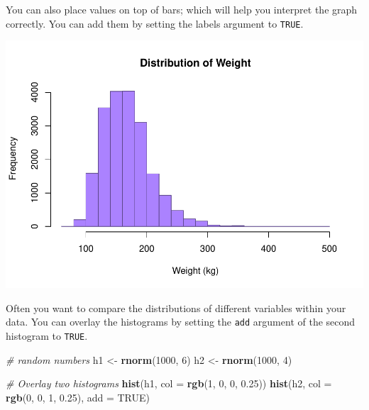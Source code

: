 \documentclass[
]{book}
\newenvironment{Shaded}{\begin{snugshade}}{\end{snugshade}}
\newcommand{\CommentTok}[1]{\textcolor[rgb]{0.56,0.35,0.01}{\textit{#1}}}
\newcommand{\DataTypeTok}[1]{\textcolor[rgb]{0.13,0.29,0.53}{#1}}
\newcommand{\DecValTok}[1]{\textcolor[rgb]{0.00,0.00,0.81}{#1}}
\newcommand{\FloatTok}[1]{\textcolor[rgb]{0.00,0.00,0.81}{#1}}
\newcommand{\KeywordTok}[1]{\textcolor[rgb]{0.13,0.29,0.53}{\textbf{#1}}}
\newcommand{\NormalTok}[1]{#1}
\newcommand{\OperatorTok}[1]{\textcolor[rgb]{0.81,0.36,0.00}{\textbf{#1}}}
\newcommand{\OtherTok}[1]{\textcolor[rgb]{0.56,0.35,0.01}{#1}}
\newcommand{\StringTok}[1]{\textcolor[rgb]{0.31,0.60,0.02}{#1}}
\begin{document}
You can also place values on top of bars; which will help you interpret the graph correctly. You can add them by setting the labels argument to \texttt{TRUE}.

\begin{Shaded}
\end{Shaded}

\includegraphics{_main_files/figure-latex/unnamed-chunk-173-1.pdf}

Often you want to compare the distributions of different variables within your data. You can overlay the histograms by setting the \texttt{add} argument of the second histogram to \texttt{TRUE}.

\begin{Shaded}
\begin{Highlighting}[]
\CommentTok{# random numbers}
\NormalTok{h1 <-}\StringTok{ }\KeywordTok{rnorm}\NormalTok{(}\DecValTok{1000}\NormalTok{, }\DecValTok{6}\NormalTok{)}
\NormalTok{h2 <-}\StringTok{ }\KeywordTok{rnorm}\NormalTok{(}\DecValTok{1000}\NormalTok{, }\DecValTok{4}\NormalTok{)}

\CommentTok{# Overlay two histograms}
\KeywordTok{hist}\NormalTok{(h1, }\DataTypeTok{col =} \KeywordTok{rgb}\NormalTok{(}\DecValTok{1}\NormalTok{, }\DecValTok{0}\NormalTok{, }\DecValTok{0}\NormalTok{, }\FloatTok{0.25}\NormalTok{))}
\KeywordTok{hist}\NormalTok{(h2, }\DataTypeTok{col =} \KeywordTok{rgb}\NormalTok{(}\DecValTok{0}\NormalTok{, }\DecValTok{0}\NormalTok{, }\DecValTok{1}\NormalTok{, }\FloatTok{0.25}\NormalTok{), }\DataTypeTok{add =} \OtherTok{TRUE}\NormalTok{)}
\end{Highlighting}
\end{Shaded}
\end{document}
